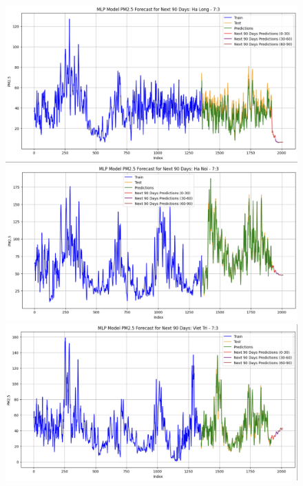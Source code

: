 \begin{figure}[H]

    \centering
    \begin{minipage}{0.15\textwidth}
    \centering
    \end{minipage}
    \hfill

    \begin{minipage}{0.15\textwidth}
        \centering
        \includegraphics[width=1\textwidth]{img/final/MLP/90D/MLP_7_3_HL.png}
        \end{minipage}
        \hfill
        \begin{minipage}{0.15\textwidth}
        \centering
        \includegraphics[width=1\textwidth]{img/final/MLP/90D/MLP_7_3_HN.png}
        \end{minipage}
        \hfill
        \begin{minipage}{0.15\textwidth}
        \centering
        \includegraphics[width=1\textwidth]{img/final/MLP/90D/MLP_7_3_VT.png}
        \end{minipage}
        \hfill


\end{figure}
